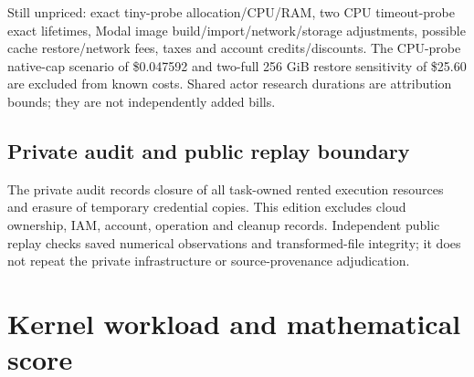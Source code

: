 \documentclass[11pt,letterpaper]{article}
\begin{document}
Still unpriced: exact tiny-probe allocation/CPU/RAM, two CPU timeout-probe exact lifetimes, Modal image build/import/network/storage adjustments, possible cache restore/network fees, taxes and account credits/discounts. The CPU-probe native-cap scenario of \$0.047592 and two-full 256 GiB restore sensitivity of \$25.60 are excluded from known costs. Shared actor research durations are attribution bounds; they are not independently added bills.

\subsection{Private audit and public replay boundary}

The private audit records closure of all task-owned rented execution resources and erasure of temporary credential copies. This edition excludes cloud ownership, IAM, account, operation and cleanup records. Independent public replay checks saved numerical observations and transformed-file integrity; it does not repeat the private infrastructure or source-provenance adjudication.

\section{Kernel workload and mathematical score}
\end{document}
